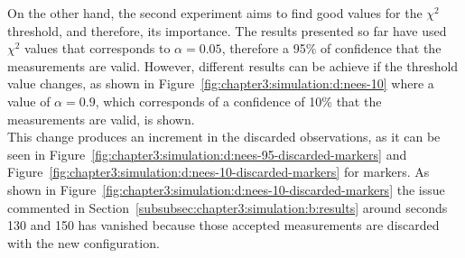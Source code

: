 On the other hand, the second experiment aims to find good values for the $\chi^2$ threshold, and therefore, its importance. The results presented so far have used $\chi^2$ values that corresponds to $\alpha=0.05$, therefore a 95\% of confidence that the measurements are valid. However, different results can be achieve if the threshold value changes, as shown in Figure~\ref{fig:chapter3:simulation:d:nees-10} where a value of $\alpha=0.9$, which corresponds of a confidence of 10\% that the measurements are valid, is shown.\\

This change produces an increment in the discarded observations, as it can be seen in Figure~\ref{fig:chapter3:simulation:d:nees-95-discarded-markers} and Figure~\ref{fig:chapter3:simulation:d:nees-10-discarded-markers} for markers. As shown in Figure~\ref{fig:chapter3:simulation:d:nees-10-discarded-markers} the issue commented in Section~\ref{subsubsec:chapter3:simulation:b:results} around seconds 130 and 150 has vanished because those accepted measurements are discarded with the new configuration.\\
